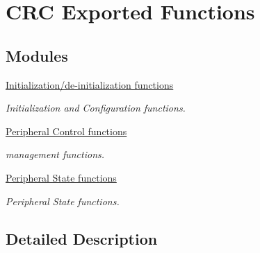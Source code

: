 \hypertarget{group___c_r_c___exported___functions}{}\section{C\+RC Exported Functions}
\label{group___c_r_c___exported___functions}
\subsection*{Modules}
\begin{DoxyCompactItemize}
\item 
\hyperlink{group___c_r_c___exported___functions___group1}{Initialization/de-\/initialization functions}
\begin{DoxyCompactList}\small\item\em Initialization and Configuration functions. \end{DoxyCompactList}\item 
\hyperlink{group___c_r_c___exported___functions___group2}{Peripheral Control functions}
\begin{DoxyCompactList}\small\item\em management functions. \end{DoxyCompactList}\item 
\hyperlink{group___c_r_c___exported___functions___group3}{Peripheral State functions}
\begin{DoxyCompactList}\small\item\em Peripheral State functions. \end{DoxyCompactList}\end{DoxyCompactItemize}


\subsection{Detailed Description}
